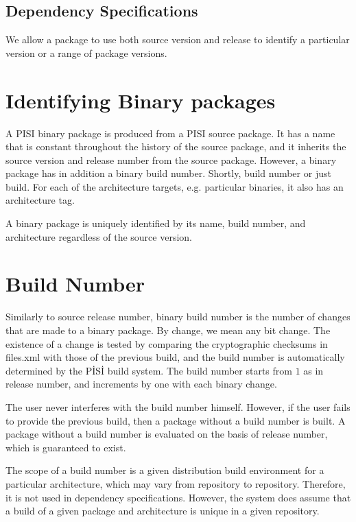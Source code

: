 \documentclass[a4paper,11pt]{article}
\begin{document}
\subsection{Dependency Specifications}

We allow a package to use both source version and release to identify
a particular version or a range of package versions.

\section{Identifying Binary packages}

A PISI binary package is produced from a PISI source package. It has a
name that is constant throughout the history of the source package,
and it inherits the source version and release number from the source
package. However, a binary package has in addition a binary build
number. Shortly, build number or just build. For each of the
architecture targets, e.g. particular binaries, it also has an
architecture tag.

A binary package is uniquely identified by its name, build number, and
architecture regardless of the source version.

\section{Build Number}

Similarly to source release number, binary build number is the number
of changes that are made to a binary package. By change, we mean any
bit change.  The existence of a change is tested by comparing the
cryptographic checksums in files.xml with those of the previous build, and the
build number is automatically determined by the P\.IS\.I build system.
The build number starts from $1$ as in release number, and increments
by one with each binary change.

The user never interferes with the build number himself. However, if
the user fails to provide the previous build, then a package without
a build number is built. A package without a build number is evaluated
on the basis of release number, which is guaranteed to exist.

The scope of a build number is a given distribution build environment
for a particular architecture, which may vary from repository to 
repository. Therefore, it is not used in dependency
specifications. However, the system does assume that a build of a  
given package and architecture is unique in a given repository.
\end{document}
